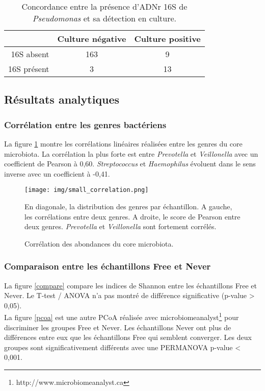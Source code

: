\documentclass[12pt,a4paper]{article}
\begin{document}
  \begin{table}[!h]
      \centering
         \caption{Concordance entre la présence d'ADNr 16S de \textit{Pseudomonas} et sa détection en culture.}
      \begin{tabular}{r|c|c}
           & Culture négative  & Culture positive \\
           \hline
           16S absent & 163 & 9 \\
           16S présent & 3 & 13   \\
      \end{tabular}

      \label{pyoculture}
  \end{table}


\subsection{Résultats analytiques}
\subsubsection{Corrélation entre les genres bactériens}
La figure \ref{correlation} montre les corrélations linéaires réalisées entre les genres du core microbiota. La corrélation la plus forte est entre \textit{Prevotella} et \textit{Veillonella} avec un coefficient de Pearson à 0,60.  \textit{Streptococcus} et \textit{Haemophilus} évoluent dans le sens inverse avec un coefficient à -0,41.


\begin{figure}[H]
\begin{center}
\texttt{[image: img/small\_correlation.png]}\hfill
\end{center}
\caption{Corrélation des abondances du core microbiota.}
En diagonale, la distribution des genres par échantillon. A gauche, les corrélations entre deux genres. A droite, le score de Pearson entre deux genres. \textit{Prevotella} et \textit{Veillonella} sont fortement corrélés.
\label{correlation}
\end{figure}

\subsubsection{Comparaison entre les échantillons Free et Never}
La figure \ref{compare} compare les indices de Shannon entre les échantillons Free et Never. Le T-test / ANOVA n'a pas montré de différence significative (p-value > 0,05). \\
La figure  \ref{pcoa} est une autre PCoA réalisée avec microbiomeanalyst\footnote{http://www.microbiomeanalyst.ca} pour discriminer les groupes Free et Never. Les échantillons Never ont plus de différences entre eux que les échantillons Free qui semblent converger. Les deux groupes sont significativement différents avec une PERMANOVA p-value < 0,001.
\end{document}
